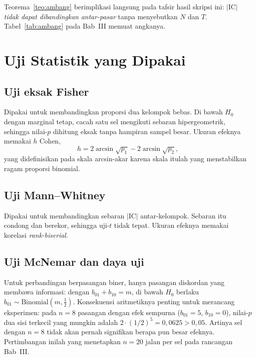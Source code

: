 \documentclass{laporanta1statugm}
\begin{document}
Teorema~\ref{teo:ambang} berimplikasi langsung pada tafsir hasil skripsi ini:
$\lvert\mathrm{IC}\rvert$ \emph{tidak dapat dibandingkan antar-pasar} tanpa
menyebutkan $N$ dan $T$. Tabel~\ref{tab:ambang} pada Bab~III memuat angkanya.

\section{Uji Statistik yang Dipakai}

\subsection{Uji eksak Fisher}

Dipakai untuk membandingkan proporsi dua kelompok bebas. Di bawah $H_0$ dengan
marginal tetap, cacah satu sel mengikuti sebaran hipergeometrik, sehingga
nilai-$p$ dihitung eksak tanpa hampiran sampel besar. Ukuran efeknya memakai
$h$ Cohen,
\begin{equation}
  h = 2\arcsin\sqrt{p_1} - 2\arcsin\sqrt{p_2},
  \label{eq:cohenh}
\end{equation}
yang didefinisikan pada skala arcsin-akar karena skala itulah yang
menstabilkan ragam proporsi binomial.

\subsection{Uji Mann--Whitney}

Dipakai untuk membandingkan sebaran $\lvert\mathrm{IC}\rvert$ antar-kelompok.
Sebaran itu condong dan berekor, sehingga uji-$t$ tidak tepat. Ukuran efeknya
memakai korelasi \textit{rank-biserial}.

\subsection{Uji McNemar dan daya uji}

Untuk perbandingan berpasangan biner, hanya pasangan diskordan yang membawa
informasi: dengan $b_{01}+b_{10}=m$, di bawah $H_0$ berlaku
$b_{01}\sim\text{Binomial}(m,\tfrac12)$. Konsekuensi aritmetiknya penting untuk
merancang eksperimen: pada $n=8$ pasangan dengan efek sempurna
($b_{01}=5$, $b_{10}=0$), nilai-$p$ dua sisi terkecil yang mungkin adalah
$2\cdot(1/2)^5 = 0{,}0625 > 0{,}05$. Artinya sel dengan $n=8$ tidak akan pernah
signifikan berapa pun besar efeknya. Pertimbangan inilah yang menetapkan
$n=20$ jalan per sel pada rancangan Bab~III.
\end{document}
